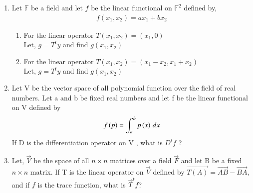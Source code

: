 \renewcommand{\theequation}{\theenumi}
\renewcommand{\thefigure}{\theenumi}
\begin{enumerate}[label=\thesubsection.\arabic*.,ref=\thesubsection.\theenumi]

\item Let $\mathbb{F}$ be a field and let $f$ be the linear functional on $\mathbb{F}^2$ defined by,
\begin{align}
f(x_1,x_2) = ax_1+bx_2
\end{align}
\begin{enumerate}
\item For the linear operator $T(x_1,x_2) = (x_1,0)$\\
Let, $g = T^ty$ and find $g(x_1,x_2)$
%
\\
\solution

\item For the linear operator $T(x_1,x_2) = (x_1-x_2,x_1+x_2)$\\
Let, $g = T^ty$ and find $g(x_1,x_2)$
\\
\solution

\end{enumerate}
%
\item Let V be the vector space of all polynomial function over the field of real numbers. Let a and b be fixed real numbers and let f be the linear functional on V defined by  
\begin{align}
    f\left(p\right) = \int_{a}^{b} p\left(x\right) \,dx
\end{align}
If D is the differentiation operator on V , what is $D^{t}f$ ?
%
\\
\solution

\item Let, $\vec{V}$ be the space of all $n \times n$ matrices over a field $\vec{F}$ and let B be a fixed $n \times n$ matrix. If T is the linear operator on $\vec{V}$ defined by $\vec{T(A)} = \vec{AB} - \vec{BA}$, and if $f$ is the trace function, what is $\vec{T}^tf$? 
%
\\
\solution

\end{enumerate}
